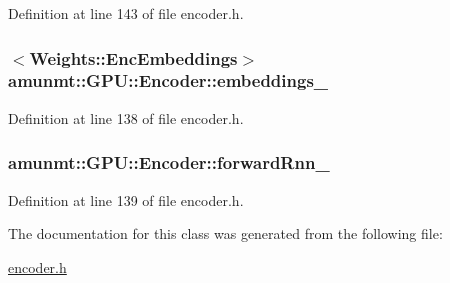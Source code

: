 Definition at line 143 of file encoder.\+h.

\subsubsection[{\texorpdfstring{embeddings\+\_\+}{embeddings_}}]{$<${\bf Weights\+::\+Enc\+Embeddings}$>$ amunmt\+::\+G\+P\+U\+::\+Encoder\+::embeddings\+\_\+\hspace{0.3cm}{\ttfamily [private]}}\hypertarget{classamunmt_1_1GPU_1_1Encoder_ab7565ccf2c9dc78964a14cf8d89e1f9b}{}\label{classamunmt_1_1GPU_1_1Encoder_ab7565ccf2c9dc78964a14cf8d89e1f9b}


Definition at line 138 of file encoder.\+h.

\subsubsection[{\texorpdfstring{forward\+Rnn\+\_\+}{forwardRnn_}}]{ amunmt\+::\+G\+P\+U\+::\+Encoder\+::forward\+Rnn\+\_\+\hspace{0.3cm}{\ttfamily [private]}}\hypertarget{classamunmt_1_1GPU_1_1Encoder_a7969e9427ccd69602c343a18f5e135ae}{}\label{classamunmt_1_1GPU_1_1Encoder_a7969e9427ccd69602c343a18f5e135ae}


Definition at line 139 of file encoder.\+h.



The documentation for this class was generated from the following file\+:\begin{DoxyCompactItemize}
\item 
\hyperlink{encoder_8h}{encoder.\+h}\end{DoxyCompactItemize}
